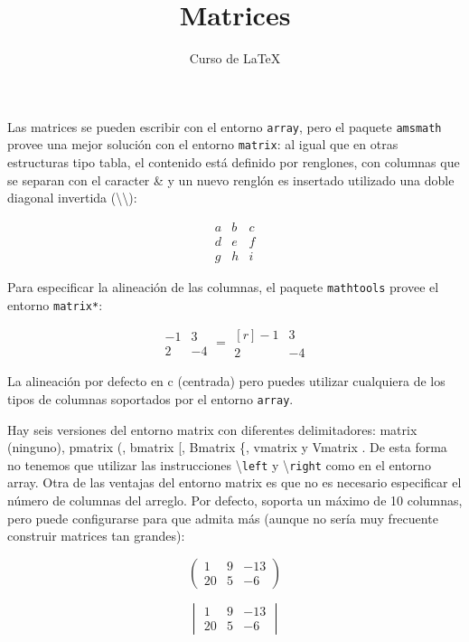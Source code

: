 \documentclass[12pt,letterpaper]{article}
\author{Curso de \LaTeX}
\title{Matrices}
\begin{document}
\maketitle

Las matrices se pueden escribir con el entorno \texttt{array}, pero el paquete \texttt{amsmath} provee una mejor solución con el entorno \texttt{matrix}: al igual que en otras estructuras tipo tabla, el contenido está definido por renglones, con columnas que se separan con el caracter \& y un nuevo renglón es insertado utilizado una doble diagonal invertida (\textbackslash\textbackslash):

\[
\begin{matrix}
  a & b & c \\
  d & e & f \\
  g & h & i
\end{matrix}
\]

Para especificar la alineación de las columnas, el paquete \texttt{mathtools} provee el entorno \texttt{matrix*}:

\[
\begin{matrix}
  -1 & 3 \\
  2 & -4
 \end{matrix}
 =
 \begin{matrix*}[r]
  -1 & 3 \\
  2 & -4
 \end{matrix*}
\]

La alineación por defecto en c (centrada) pero puedes utilizar cualquiera de los tipos de columnas soportados por el entorno \texttt{array}.

Hay seis versiones del entorno matrix con diferentes delimitadores: matrix (ninguno), pmatrix (, bmatrix [, Bmatrix \{, vmatrix \textbar y Vmatrix \textbardbl. De esta forma no tenemos que utilizar las instrucciones \textbackslash\texttt{left} y \textbackslash\texttt{right} como en el entorno array. Otra de las ventajas del entorno matrix es que no es necesario especificar el número de columnas del arreglo. Por defecto, soporta un máximo de 10 columnas, pero puede configurarse para que admita más (aunque no sería muy frecuente construir matrices tan grandes):

\[
\begin{pmatrix}
	1 & 9 & -13 \\
	20 & 5 & -6
\end{pmatrix}
\]


\[
\begin{vmatrix}
	1 & 9 & -13 \\
	20 & 5 & -6
\end{vmatrix}
\]
\end{document}

